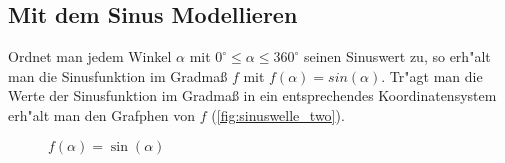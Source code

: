 \documentclass{standalone}
\begin{document}
\subsection{Mit dem Sinus Modellieren}
Ordnet man jedem Winkel $\alpha$ mit $0^\circ \leq \alpha \leq 360^\circ$  seinen Sinuswert zu, so erh{"a}lt man die Sinusfunktion im Gradma{\ss} $f$ mit $f(\alpha) = sin(\alpha)$. Tr{"a}gt man die Werte der Sinusfunktion im Gradma{\ss} in ein entsprechendes Koordinatensystem erh{"a}lt man den Grafphen von $f$ (\autoref{fig:sinuswelle_two}).

\begin{figure}[hb!]
  \center
  \def\svgwidth{450px}
  
  \caption{$f(\alpha) = \sin(\alpha)$}
  \label{fig:sinuswelle_two}
\end{figure}
\end{document}

